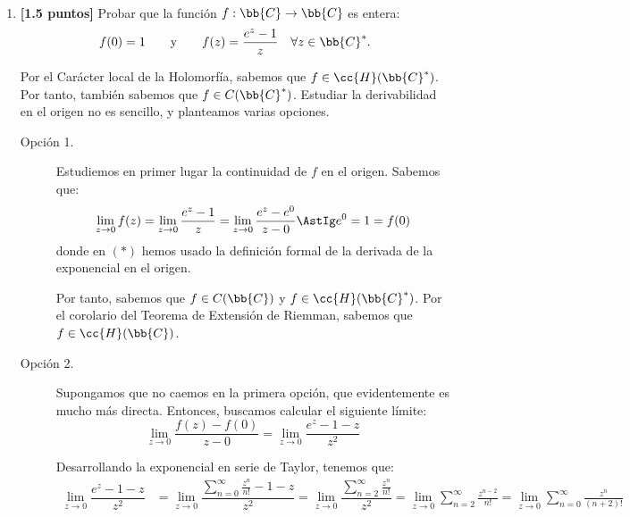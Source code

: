 \documentclass[12pt]{article}
\begin{document}
    \begin{ejercicio}~
        \begin{enumerate}
            \item \textbf{[1.5 puntos]} Probar que la función $f:\bb{C}\to \bb{C}$ es entera:
            \begin{equation*}
                f(0)=1\qquad \text{y}\qquad f(z)=\dfrac{e^z-1}{z}\quad \forall z\in\bb{C}^*.
            \end{equation*}

            Por el Carácter local de la Holomorfía, sabemos que $f\in \cc{H}(\bb{C}^*)$. Por tanto, también sabemos que $f\in C(\bb{C}^*)$. Estudiar la derivabilidad en el origen no es sencillo, y planteamos varias opciones.

            \begin{description}
                \item[Opción 1.] 

                Estudiemos en primer lugar la continuidad de $f$ en el origen. Sabemos que:
                \begin{equation*}
                    \lim_{z\to 0} f(z) = \lim_{z\to 0} \frac{e^z-1}{z} = \lim_{z\to 0} \frac{e^z-e^0}{z-0} \AstIg e^0 = 1 = f(0)
                \end{equation*}
                donde en $(\ast)$ hemos usado la definición formal de la derivada de la exponencial en el origen.
    
                Por tanto, sabemos que $f\in C(\bb{C})$ y $f\in \cc{H}(\bb{C}^*)$.
                Por el corolario del Teorema de Extensión de Riemman, sabemos que $f\in \cc{H}(\bb{C})$.
                
                \item[Opción 2.] Supongamos que no caemos en la primera opción, que evidentemente es mucho más directa. Entonces, buscamos calcular el siguiente límite:
                \begin{equation*}
                    \lim_{z\to 0} \dfrac{f(z)-f(0)}{z-0} = \lim_{z\to 0} \dfrac{e^z-1-z}{z^2}
                \end{equation*}

                Desarrollando la exponencial en serie de Taylor, tenemos que:
                \begin{align*}
                    \lim_{z\to 0} \dfrac{e^z-1-z}{z^2} &= \lim_{z\to 0} \dfrac{\sum\limits_{n=0}^{\infty} \frac{z^n}{n!}-1-z}{z^2} = \lim_{z\to 0} \dfrac{\sum\limits_{n=2}^{\infty} \frac{z^n}{n!}}{z^2} = \lim_{z\to 0} \sum\limits_{n=2}^{\infty} \frac{z^{n-2}}{n!}
                    = \lim_{z\to 0} \sum\limits_{n=0}^{\infty} \frac{z^n}{(n+2)!}
                \end{align*}


\end{description}
\end{enumerate}
\end{ejercicio}
\end{document}
